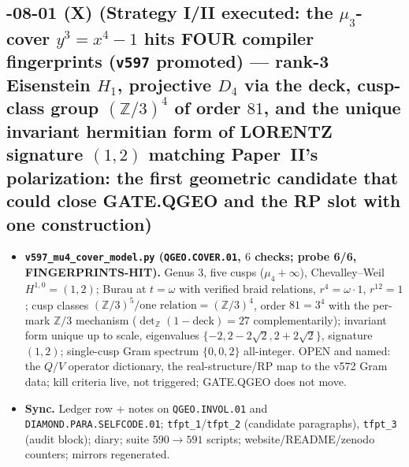 \documentclass[11pt]{article}
\begin{document}
\subsection*{-08-01 (X) (Strategy I/II executed: the $\mu_3$-cover $y^3=x^4-1$ hits FOUR compiler fingerprints (\texttt{v597} promoted) --- rank-3 Eisenstein $H_1$, projective $D_4$ via the deck, cusp-class group $(\mathbb{Z}/3)^4$ of order $81$, and the unique invariant hermitian form of LORENTZ signature $(1,2)$ matching Paper~II's polarization: the first geometric candidate that could close GATE.QGEO and the RP slot with one construction)}
\begin{itemize}[leftmargin=1.5em]
\item \textbf{\texttt{v597\_mu4\_cover\_model.py} (\texttt{QGEO.COVER.01}, $6$ checks;
probe 6/6, FINGERPRINTS-HIT).} Genus $3$, five cusps ($\mu_4+\infty$), Chevalley--Weil
$H^{1,0}=(1,2)$; Burau at $t=\omega$ with verified braid relations, $r^4=\omega\cdot1$,
$r^{12}=1$; cusp classes $(\mathbb{Z}/3)^5/\text{one relation}=(\mathbb{Z}/3)^4$, order
$81=3^4$ with the per-mark $\mathbb{Z}/3$ mechanism ($\det_{\mathbb{Z}}(1-\text{deck})=27$
complementarily); invariant form unique up to scale, eigenvalues $\{-2, 2{-}2\sqrt2,
2{+}2\sqrt2\}$, signature $(1,2)$; single-cusp Gram spectrum $\{0,0,2\}$ all-integer.
OPEN and named: the $Q/V$ operator dictionary, the real-structure/RP map to the v572 Gram
data; kill criteria live, not triggered; GATE.QGEO does not move.
\item \textbf{Sync.} Ledger row + notes on \texttt{QGEO.INVOL.01} and
\texttt{DIAMOND.PARA.SELFCODE.01}; \texttt{tfpt\_1}/\texttt{tfpt\_2} (candidate
paragraphs), \texttt{tfpt\_3} (audit block); diary; suite $590\to591$ scripts;
website/README/zenodo counters; mirrors regenerated.
\end{itemize}
\end{document}
